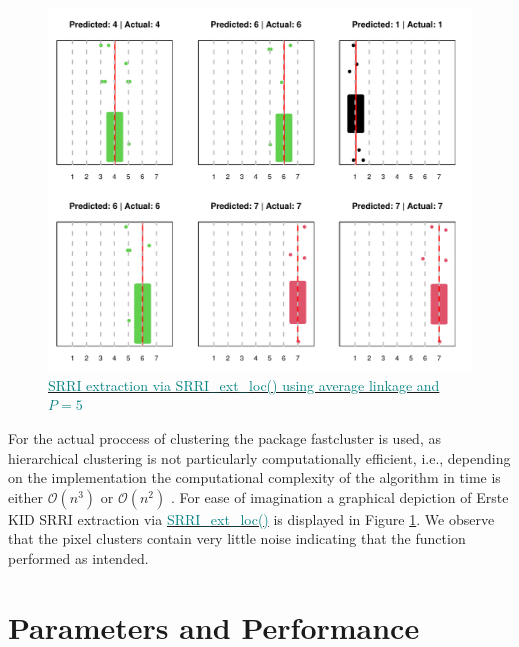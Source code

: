 \documentclass[aodsor,preprint]{imsart}
\numberwithin{equation}{section}
\theoremstyle{plain}
\begin{document}
\begin{figure}[H]
	\includegraphics[width = 12cm]{Ersteextr.pdf}
	\caption{\href{https://github.com/Base-R-Best-R/KID/blob/main/Code/Tests/Test_ext_Function.pdf}{\textcolor{teal}{SRRI extraction via SRRI\_ext\_loc() using average linkage and $P = 5$}}}
	\label{fig6}
\end{figure}

 For the actual proccess of clustering the package fastcluster is used, as hierarchical clustering is not particularly computationally efficient, i.e., depending on the implementation the computational complexity of the algorithm in time is either $\mathcal{O}(n^3)$ or $\mathcal{O}(n^2)$ \citep{JSSv053i09, Rok09}. For ease of imagination a graphical depiction of Erste KID SRRI extraction via \href{https://github.com/Base-R-Best-R/KID/blob/main/Code/Package/KIDs/R/SRRI_ext_loc.R}{\textcolor{teal}{SRRI\_ext\_loc()}} is displayed in Figure \ref{fig6}. We observe that the pixel clusters contain very little noise indicating that the function performed as intended.


\section{Parameters and Performance} 
\end{document}
